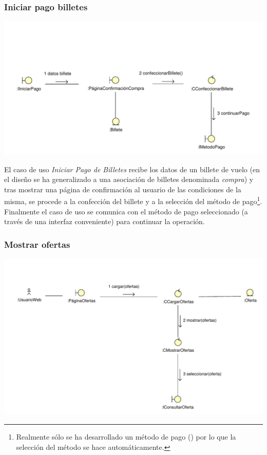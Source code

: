 \documentclass[11pt, a4paper, twoside, titlepage]{article}
\begin{document}
			\subsubsection{Iniciar pago billetes}
				\begin{center}
					\includegraphics[scale=.76]{analisis/diagramas/iniciarpagobilletes.pdf}
				\end{center}

					El caso de uso {\itshape Iniciar Pago de Billetes} recibe los datos de un billete de vuelo (en el diseño se ha generalizado a una asociación de billetes denominada {\itshape compra}) y tras mostrar una página de confirmación al usuario de las condiciones de la misma, se procede a la confección del billete y a la selección del método de pago\footnote{Realmente sólo se ha desarrollado un método de pago () por lo que la selección del método se hace automáticamente.}. Finalmente el caso de uso se comunica con el método de pago seleccionado (a través de una interfaz conveniente) para continuar la operación.

			\subsubsection{Mostrar ofertas}
				\begin{center}
					\includegraphics[scale=.72]{analisis/diagramas/mostrarofertas.pdf}
				\end{center}
\end{document}
